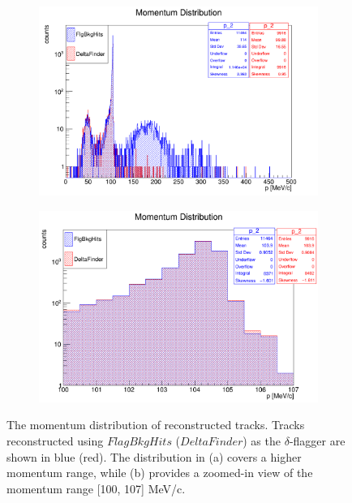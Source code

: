 \begin{figure}[!h]
    \begin{subfigure}[b]{0.5\textwidth}
        \centering
        \includegraphics[width = 1.1\textwidth]{figures/png/Screenshot_20240820_162125.png}
        \subcaption{}
        \label{fig:highlevel1}
    \end{subfigure}
    \begin{subfigure}[b]{0.5\textwidth}
        \centering
        \includegraphics[width = 1.1\textwidth]{figures/png/Screenshot_20240820_160904.png}
        \subcaption{}
        \label{fig:highlevel2}
    \end{subfigure}
    \caption[Momentum distribution of reconstructed tracks.]{The momentum distribution of reconstructed tracks. 
    Tracks reconstructed using $FlagBkgHits$ ($DeltaFinder$) 
    as the $\delta$-flagger are shown in blue (red). 
    The distribution in (a) covers a higher momentum range, while (b) 
    provides a zoomed-in view of the momentum range [100, 107] MeV/c.
    }
    \label{fig:highlevel} 
\end{figure}

